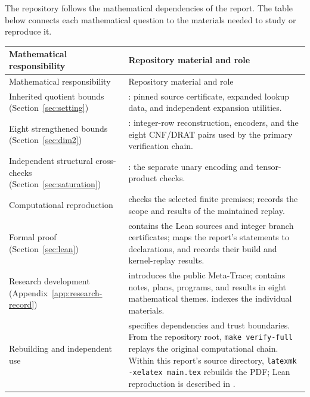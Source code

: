 \documentclass[11pt,a4paper]{article}
\begin{document}
The repository follows the mathematical dependencies of the report.
The table below connects each mathematical question to the materials
needed to study or reproduce it.

\begin{longtable}{@{}L{4.8cm}L{9.8cm}@{}}
\toprule
Mathematical responsibility & Repository material and role\\
\midrule
\endfirsthead
\toprule Mathematical responsibility & Repository material and role\\\midrule
\endhead
\bottomrule\endfoot
Inherited quotient bounds (Section~\ref{sec:setting})
& : pinned source certificate, expanded
lookup data, and independent expansion utilities.\\
Eight strengthened bounds (Section~\ref{sec:dim2})
& : integer-row reconstruction, encoders,
and the eight CNF/DRAT pairs used by the primary verification chain.\\
Independent structural cross-checks (Section~\ref{sec:saturation})
& : the separate unary encoding and
tensor-product checks.\\
Computational reproduction
&  checks the selected finite
premises;  records the scope and results
of the maintained replay.\\
Formal proof (Section~\ref{sec:lean})
&  contains the Lean sources and integer branch
certificates;  maps the report's statements
to declarations, and 
records their build and kernel-replay results.\\
Research development (Appendix~\ref{app:research-record})
&  introduces the public Meta-Trace;
 contains notes, plans, programs, and results
in eight mathematical themes.  indexes
the individual materials.\\
Rebuilding and independent use
&  specifies dependencies and trust
boundaries. From the repository root, \texttt{make verify-full} replays the
original computational chain. Within this report's source directory,
\texttt{latexmk -xelatex main.tex} rebuilds the PDF; Lean reproduction
is described in .\\
\end{longtable}
\end{document}
